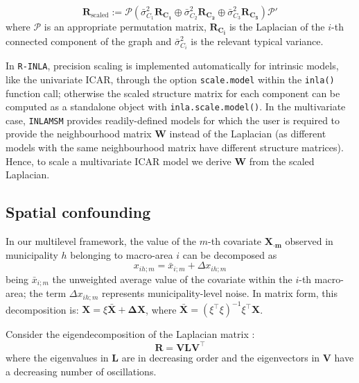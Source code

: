 \documentclass[openany]{book}
\begin{document}
$$
\mathbf{R}_\mathrm{scaled} := \mathcal{P} \left( \bar{\sigma}_{C_1}^2 \mathbf{R_{C_1}} \oplus \bar{\sigma}_{C_2}^2 \mathbf{R_{C_2}}  
\oplus \bar{\sigma}_{C_3}^2 \mathbf{R_{C_3}} \right) \mathcal{P'}
$$
where $\mathcal{P}$ is an appropriate permutation matrix, $\mathbf{R_{C_i}}$ is the Laplacian of the $i$-th connected component of the graph and $\bar{\sigma}_{C_i}^2$ is the relevant typical variance. 



In \texttt{R-INLA}, precision scaling is implemented automatically for intrinsic models, like the univariate ICAR, through the option \texttt{scale.model} within the \texttt{inla()} function call; otherwise the scaled structure matrix for each component can be computed as a standalone object with \texttt{inla.scale.model()}. In the multivariate case, \texttt{INLAMSM} provides readily-defined models for which the user is required to provide the neighbourhood matrix $\mathbf{W}$ instead of the Laplacian (as different models with the same neighbourhood matrix have different structure matrices). Hence, to scale a multivariate ICAR model we derive $\mathbf{W}$ from the scaled Laplacian.

\subsection{Spatial confounding}


In our multilevel framework, the value of the $m$-th covariate $\mathbf{X_{\cdot m}}$ observed in municipality $h$ belonging to macro-area $i$ can be decomposed as
$$
x_{ih;m} = \bar{x}_{i;m} + \Delta x_{ih;m}
$$
being $\bar{x}_{i;m}$ the unweighted average value of the covariate within the $i$-th macro-area; the term $\Delta x_{ih;m}$ represents municipality-level noise. In matrix form, this decomposition is: $\mathbf{X}= \xi \bar{\mathbf{X}} + \mathbf{\Delta X}$, where $\bar{\mathbf{X}} = (\xi ^{\top} \xi)^{-1} \xi^{\top} \mathbf{X}$.

Consider the eigendecomposition of the Laplacian matrix \citep{Urdangarin24}: 
$$
\mathbf{R} = \mathbf{VLV}^{\top}
$$
where the eigenvalues in $\mathbf{L}$ are in decreasing order and the eigenvectors in $\mathbf{V}$ have a decreasing number of oscillations. 
\end{document}
